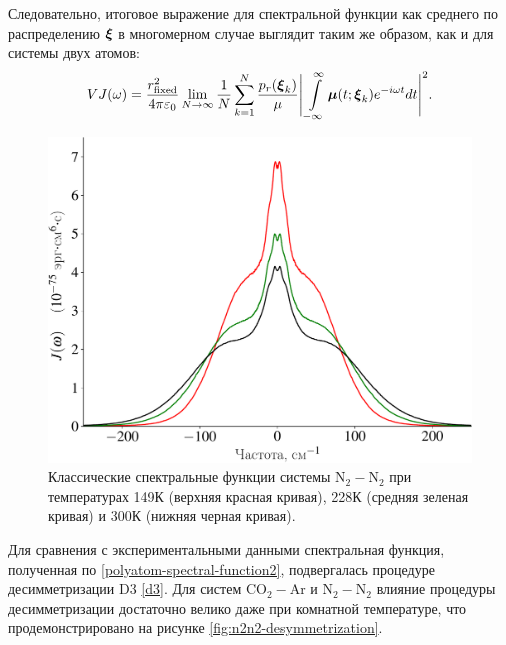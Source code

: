 Следовательно, итоговое выражение для спектральной функции как среднего по распределению $\boldsymbol{\xi}$ в многомерном случае выглядит таким же образом, как и для системы двух атомов:
\begin{gather}
    V J(\omega) = \frac{r_\text{fixed}^2}{4 \pi \varepsilon_0} \lim_{N \rightarrow \infty} \frac{1}{N} \sum_{k = 1}^N \frac{p_r(\boldsymbol{\xi}_k)}{\mu} \Bigg\vert \int\limits_{-\infty}^\infty \boldsymbol{\mu}(t; \boldsymbol{\xi}_k) e^{-i \omega t} dt \Bigg\vert^2. \label{polyatom-spectral-function2}
\end{gather}

\begin{figure}[H]
    \centering
    \includegraphics[width=0.7\linewidth]{./pictures/polyatom_spectra/n2n2_spectral_functions-crop.pdf}
    \caption{Классические спектральные функции системы N$_2-$N$_2$ при температурах 149К (верхняя красная кривая), 228К (средняя зеленая кривая) и 300К (нижняя черная кривая).}
    \label{fig:n2n2-spectral-functions}
\end{figure}

Для сравнения с экспериментальными данными спектральная функция, полученная по \eqref{polyatom-spectral-function2},  подвергалась процедуре десимметризации D3 \eqref{d3}. Для систем CO$_2-$Ar и N$_2-$N$_2$ влияние процедуры десимметризации достаточно велико даже при комнатной температуре, что продемонстрировано на рисунке \ref{fig:n2n2-desymmetrization}. 

